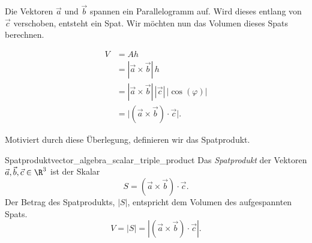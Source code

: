 Die Vektoren $\vec a$ und $\vec b$ spannen ein Parallelogramm auf. Wird dieses
entlang von $\vec c$ verschoben, entsteht ein Spat. Wir möchten nun das Volumen
dieses Spats berechnen.

\noindent
\begin{minipage}[c]{0.57\linewidth}
  \[
    \begin{aligned}
      V
      &=A h \\
      &=|\vec a\times\vec b|\,h\\
      &=|\vec a\times\vec b|\,|\vec c|\,|\cos(\varphi)|\\
      &=\bigl|(\vec a\times\vec b)\cdot\vec c\bigr|.
    \end{aligned}
  \]
\end{minipage}\hfill
\begin{minipage}[c]{0.39\linewidth}
  \centering
\end{minipage}

Motiviert durch diese Überlegung, definieren wir das Spatprodukt.
\begin{DefinitionBox}{Spatprodukt}{vector_algebra_scalar_triple_product}
  Das \emph{Spatprodukt}  der Vektoren
  $\vec a,\vec b,\vec c\in\R^3$ ist der Skalar
  \[
    S=(\vec a\times\vec b)\cdot\vec c.
  \]
  Der Betrag des Spatprodukts, $|S|$, entspricht dem Volumen des aufgespannten
  Spats.
  \[
    V = |S| = |(\vec a\times\vec b)\cdot\vec c|.
  \]
\end{DefinitionBox}

